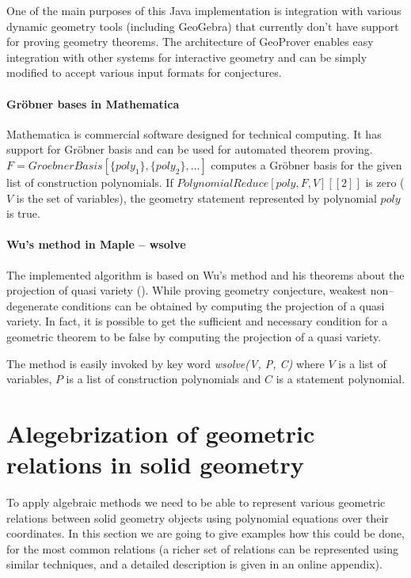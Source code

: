 \documentclass[final,1p,times,authoryear]{elsarticle}
\begin{document}
One of the main purposes of this Java implementation is integration
with various dynamic geometry tools (including GeoGebra) that
currently don't have support for proving geometry theorems. The
architecture of GeoProver enables easy integration with other systems
for interactive geometry and can be simply modified to accept various
input formats for conjectures.

\paragraph{Gr\"obner bases in Mathematica}

Mathematica is commercial software designed for technical
computing. It has support for Gr\"obner basis and can be used for
automated theorem proving. $F = GroebnerBasis[\{poly_1\}, \{poly_2\},
  \ldots]$ computes a Gr\"obner basis for the given list of
construction polynomials. If $PolynomialReduce[poly, F, V][[2]]$ is
zero ($V$ is the set of variables), the geometry statement represented
by polynomial $poly$ is true.

\paragraph{Wu's method in Maple -- wsolve}

The implemented algorithm is based on Wu's method and his theorems
about the projection of quasi variety (\cite{quasivarieties}). While
proving geometry conjecture, weakest non--degenerate conditions can be
obtained by computing the projection of a quasi variety. In fact, it
is possible to get the sufficient and necessary condition for a
geometric theorem to be false by computing the projection of a quasi
variety.

The method is easily invoked by key word \emph{wsolve(V, P, C)} where
$V$ is a list of variables, $P$ is a list of construction polynomials
and $C$ is a statement polynomial.

\section{Alegebrization of geometric relations in solid geometry}
\label{polynomials}
To apply algebraic methods we need to be able to represent various
geometric relations between solid geometry objects using polynomial
equations over their coordinates. In this section we are going to give
examples how this could be done, for the most common relations (a
richer set of relations can be represented using similar techniques,
and a detailed description is given in an online
appendix). 
\end{document}
